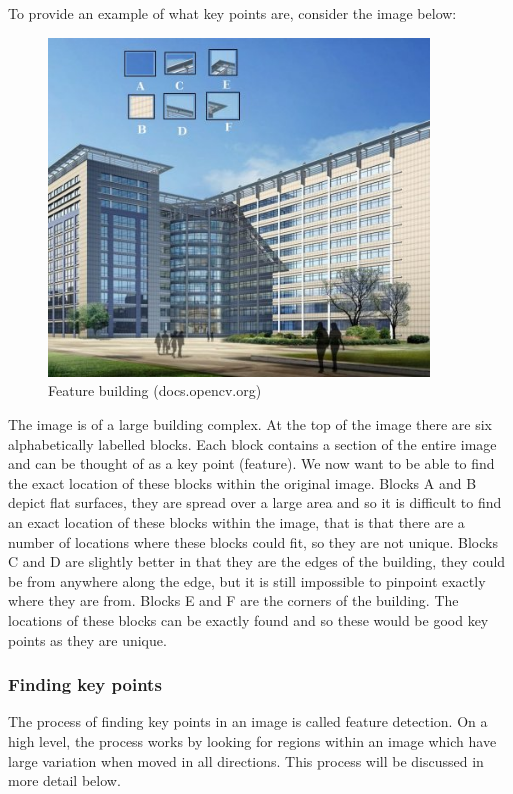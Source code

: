\documentclass[11pt,a4paper]{report}
\begin{document}
				To provide an example of what key points are, consider the image below:
				
				\begin{figure}[H]
					\centering
					\includegraphics[width=0.9\textwidth]{feature_building}
					\caption{Feature building (docs.opencv.org)}
					\label{fig:feature_building}
				\end{figure}
				
				The image is of a large building complex. At the top of the image there are six alphabetically labelled blocks. Each block contains a section of the entire image and can be thought of as a key point (feature). We now want to be able to find the exact location of these blocks within the original image. 
				Blocks A and B depict flat surfaces, they are spread over a large area and so it is difficult to find an exact location of these blocks within the image, that is that there are a number of locations where these blocks could fit, so they are not unique.
				Blocks C and D are slightly better in that they are the edges of the building, they could be from anywhere along the edge, but it is still impossible to pinpoint exactly where they are from.
				Blocks E and F are the corners of the building. The locations of these blocks can be exactly found and so these would be good key points as they are unique.
			
			\subsubsection{Finding key points}
				The process of finding key points in an image is called feature detection. On a high level, the process works by looking for regions within an image which have large variation when moved in all directions. This process will be discussed in more detail below.
				
\end{document}
